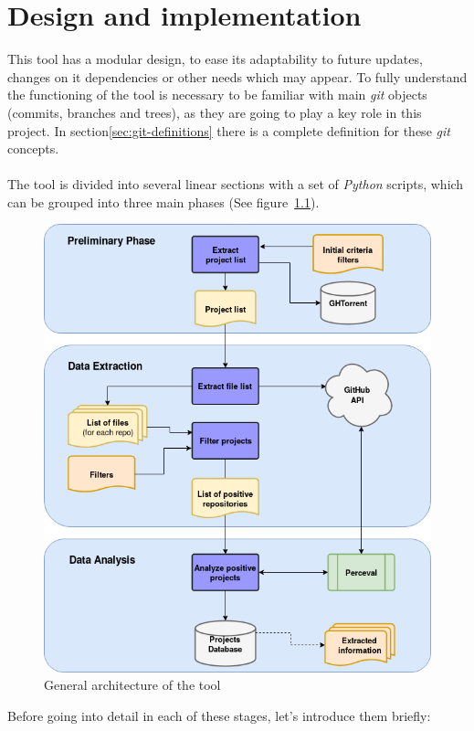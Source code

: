 \documentclass[a4paper, 12pt]{book}
\begin{document}
\chapter{Design and implementation}
\label{sec:design-implementation}
This tool has a modular design, to ease its adaptability to future updates, changes on it dependencies or other needs which may appear.
To fully understand the functioning of the tool is necessary to be familiar with main \emph{git} objects (commits, branches and trees),
as they are going to play a key role in this project. In section\ref{sec:git-definitions} there is a complete definition for these \emph{git} concepts.\\\\
The tool is divided into several linear sections with a set of \emph{Python} scripts, which can be grouped into three
main phases (See figure~\ref{fig:arquitectura}).
\begin{figure}
  \centering
  \includegraphics[width=12cm, keepaspectratio]{img/generic-tool-diagram-sections}
  \caption{General architecture of the tool}
  \label{fig:arquitectura}
\end{figure}
Before going into detail in each of these stages, let's introduce them briefly:
\end{document}

